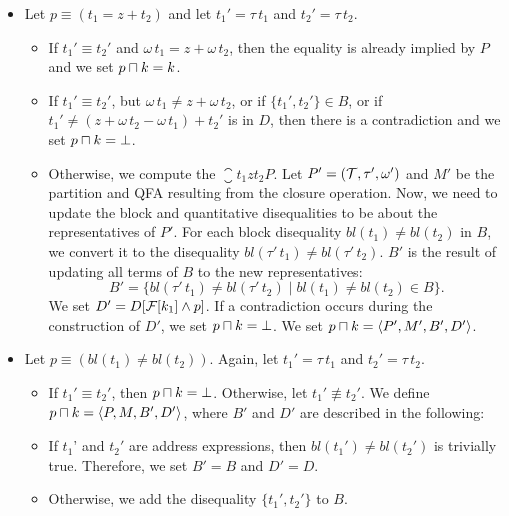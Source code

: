 \begin{itemize}
    \item Let $p \equiv (t_1 = z + t_2)$ and let $t_1'=\tau\,t_1$ and $t_2'=\tau\,t_2$.
          \begin{itemize}
              \item If $t_1' \equiv t_2'$ and $\omega\,t_1 = z + \omega\,t_2$,
                    then the equality is already implied by $P$ and we set $p \sqcap k = k$.
              \item If $t_1' \equiv t_2'$, but $\omega\,t_1 \neq z + \omega\,t_2$,
                    or if $\{t_1',t_2'\}\in B$, or if $t_1' \neq (z + \omega\,t_2 - \omega\,t_1) + t_2'$ is in $D$,
                    then there is a contradiction and we set $p \sqcap k = \bot$.
              \item Otherwise, we compute the $\closure{t_1}{z}{t_2}{P}$.
                    Let $P' = (\mathcal{T}, \tau', \omega')$ and $M'$ be the partition and QFA resulting from the closure operation.
                    Now, we need to update the block and quantitative disequalities to be about the representatives of $P'$.
                    For each block disequality $bl(t_1) \neq bl(t_2)$ in $B$, we convert it to the disequality $bl(\tau'\,t_1) \neq bl(\tau'\,t_2)$.
                    $B'$ is the result of updating all terms of $B$ to the new representatives:
                    \[
                        B' = \{bl(\tau'\,t_1) \neq bl(\tau'\,t_2) \mid bl(t_1) \neq bl(t_2) \in B\}.
                    \]
                    We set $D' = D[\mathcal{F}[k_1] \land p]$.
                    If a contradiction occurs during the construction of $D'$, we set $p \sqcap k = \bot$.
                    We set $p \sqcap k = \langle P',M',B',D'\rangle$.
          \end{itemize}
    \item Let $p \equiv (bl(t_1) \neq bl(t_2))$. Again, let $t_1'=\tau\,t_1$ and $t_2'=\tau\,t_2$.
          \begin{itemize}
              \item If $t_1' \equiv t_2'$, then $p \sqcap k = \bot$.
                    Otherwise, let $t_1' \nequiv t_2'$. We define $p \sqcap k = \langle P,M,B', D'\rangle$, where $B'$ and $D'$ are described in the following:
              \item If $t_1$' and $t_2'$ are address expressions, then $bl(t_1') \neq bl(t_2')$ is trivially true.
                    Therefore, we set $B'= B$ and $D'=D$.
              \item Otherwise, we add the disequality $\{t_1',t_2'\}$ to $B$.

\end{itemize}
\end{itemize}
